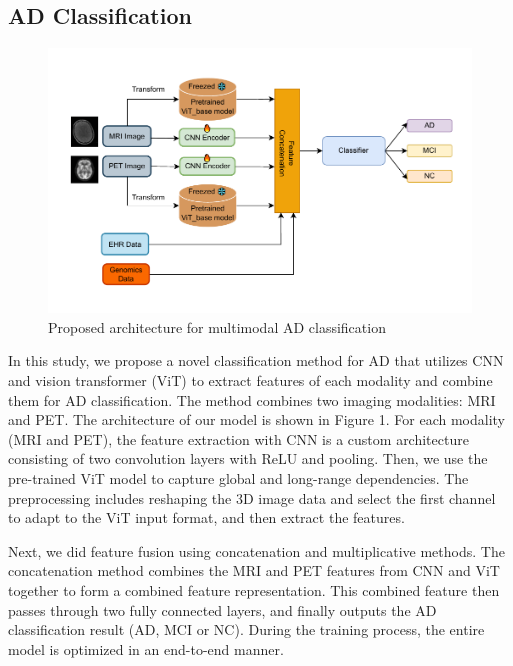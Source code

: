 \subsection{AD Classification}
\begin{figure}
    \centering
    \includegraphics[width=1\linewidth]{figs/arch-classification_new.pdf}
    
    \caption{Proposed architecture for multimodal AD classification}
    \vspace{-2mm}
    \label{fig:enter-label}
\end{figure}
In this study, we propose a novel classification method for AD that utilizes CNN and vision transformer (ViT\cite{dosovitskiy_image_2021}) to extract features of each modality and combine them for AD classification. The method combines two imaging modalities: MRI and PET. The architecture of our model is shown in Figure 1. For each modality (MRI and PET), the feature extraction with CNN is a custom architecture consisting of two convolution layers with ReLU and pooling. Then, we use the pre-trained ViT model to capture global and long-range dependencies. The preprocessing includes reshaping the 3D image data and select the first channel to adapt to the ViT input format, and then extract the features. 

Next, we did feature fusion using concatenation and multiplicative methods. The concatenation method combines the MRI and PET features from CNN and ViT together to form a combined feature representation. This combined feature then passes through two fully connected layers, and finally outputs the AD classification result (AD, MCI or NC). During the training process, the entire model is optimized in an end-to-end manner. 

